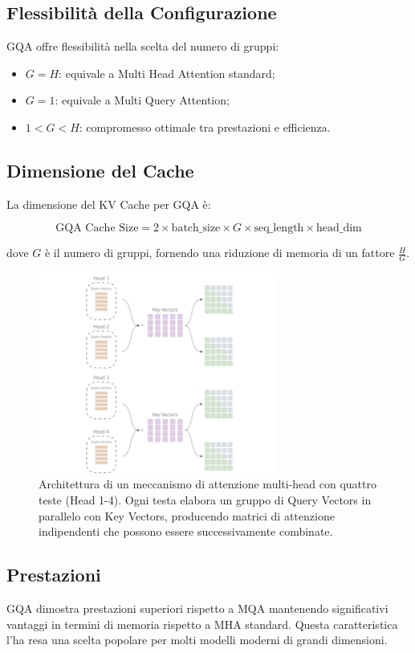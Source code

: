 \subsection{Flessibilità della Configurazione}
GQA offre flessibilità nella scelta del numero di gruppi:
\begin{itemize}
    \item $G = H$: equivale a Multi Head Attention standard;
    \item $G = 1$: equivale a Multi Query Attention;
    \item $1 < G < H$: compromesso ottimale tra prestazioni e efficienza.
\end{itemize}

\subsection{Dimensione del Cache}
La dimensione del KV Cache per GQA è:

\[
\text{GQA Cache Size} = 2 \times \text{batch\_size} \times G \times \text{seq\_length} \times \text{head\_dim}
\]

dove $G$ è il numero di gruppi, fornendo una riduzione di memoria di un fattore $\frac{H}{G}$.
\begin{figure}
    \centering
    \includegraphics[width=0.7\textwidth]{figure/GPA.png}
    \caption{Architettura di un meccanismo di attenzione multi-head con quattro teste (Head 1-4). Ogni testa elabora un gruppo di Query Vectors in parallelo con Key Vectors, producendo matrici di attenzione indipendenti che possono essere successivamente combinate.}
    \label{fig:gpa}
\end{figure}
\subsection{Prestazioni}
GQA dimostra prestazioni superiori rispetto a MQA mantenendo significativi vantaggi in termini di memoria rispetto a MHA standard. Questa caratteristica l'ha resa una scelta popolare per molti modelli moderni di grandi dimensioni.

